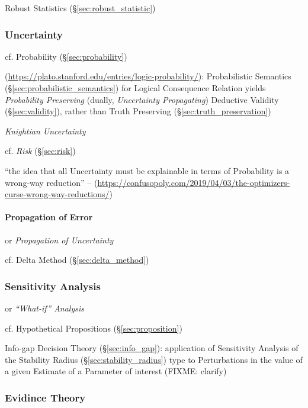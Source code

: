 \fist Robust Statistics (\S\ref{sec:robust_statistic})



\subsubsection{Uncertainty}\label{sec:uncertainty}

cf. Probability (\S\ref{sec:probability})

(\url{https://plato.stanford.edu/entries/logic-probability/}): Probabilistic
Semantics (\S\ref{sec:probabilistic_semantics}) for Logical Consequence Relation
yields \emph{Probability Preserving} (dually, \emph{Uncertainty Propagating})
Deductive Validity (\S\ref{sec:validity}), rather than Truth Preserving
(\S\ref{sec:truth_preservation})

\emph{Knightian Uncertainty}

cf. \emph{Risk} (\S\ref{sec:risk})

``the idea that all Uncertainty must be explainable in terms of Probability is a
wrong-way reduction'' --
(\url{https://confusopoly.com/2019/04/03/the-optimizers-curse-wrong-way-reductions/})



\paragraph{Propagation of Error}\label{sec:error_propagation}\hfill

or \emph{Propagation of Uncertainty}

\fist cf. Delta Method (\S\ref{sec:delta_method})



\subsubsection{Sensitivity Analysis}\label{sec:sensitivity_analysis}

or \emph{``What-if'' Analysis}

cf. Hypothetical Propositions (\S\ref{sec:proposition})

\fist Info-gap Decision Theory (\S\ref{sec:info_gap}): application of
Sensitivity Analysis of the Stability Radius (\S\ref{sec:stability_radius}) type
to Perturbations in the value of a given Estimate of a Parameter of interest
(FIXME: clarify)



\subsubsection{Evidince Theory}\label{sec:evidence_theory}

